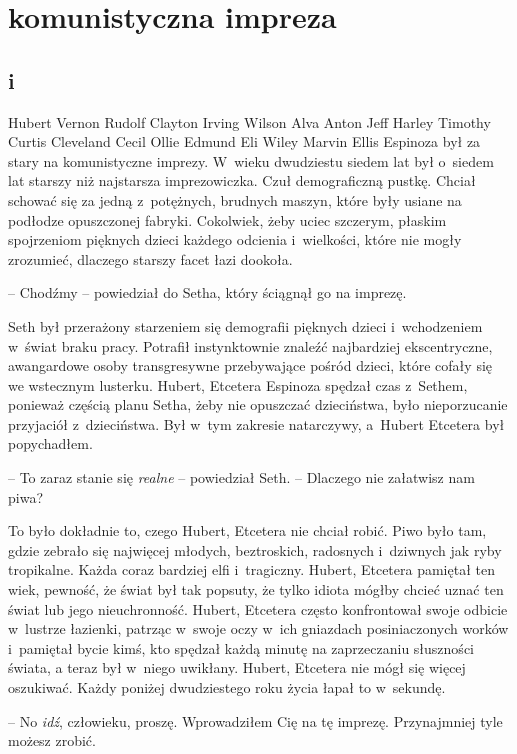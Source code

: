 \documentclass[oneside,polish,11pt,sfheadings]{mwbk}
\begin{document}
\vfill


\part{komunistyczna impreza}
\chapter*{i}

Hubert Vernon Rudolf Clayton Irving Wilson Alva Anton Jeff Harley
Timothy Curtis Cleveland Cecil Ollie Edmund Eli Wiley Marvin Ellis
Espinoza był za stary na komunistyczne imprezy. W~wie\-ku dwudziestu siedem lat był o~siedem lat starszy niż najstarsza imprezowiczka. Czuł demograficzną
pustkę. Chciał schować się za jedną z~potężnych, brudnych maszyn, które
były usiane na podłodze opuszczonej fabryki. Cokolwiek, żeby uciec
szczerym, płaskim spojrzeniom pięknych dzieci każdego odcienia i~wielkości, które nie mogły zrozumieć, dlaczego starszy facet łazi
dookoła.

-- Chodźmy -- powiedział do Setha, który ściągnął go na imprezę. 

Seth był przerażony starzeniem się demografii pięknych dzieci i~wchodzeniem w~świat braku pracy. Potrafił instynktownie znaleźć najbardziej
ekscentryczne, awangardowe osoby transgresywne przebywające pośród
dzieci, które cofały się we wstecznym lusterku. Hubert, Etcetera
Espinoza spędzał czas z~Sethem, ponieważ częścią planu Setha, żeby
nie opuszczać dzieciństwa, było nieporzucanie przyjaciół z~dzieciństwa.
Był w~tym zakresie natarczywy, a~Hubert Etcetera był popychadłem.

-- To zaraz stanie się \textit{realne} -- powiedział Seth. -- Dlaczego nie
załatwisz nam piwa?

To było dokładnie to, czego Hubert, Etcetera nie chciał robić. Piwo było
tam, gdzie zebrało się najwięcej młodych, beztroskich, radosnych i~dziwnych jak ryby tropikalne. Każda coraz bardziej elfi i~tragiczny.
Hubert, Etcetera pamiętał ten wiek, pewność, że świat był tak popsuty,
że tylko idiota mógłby chcieć uznać ten świat lub jego nieuchronność.
Hubert, Etcetera często konfrontował swoje odbicie w~lustrze łazienki,
patrząc w~swoje oczy w~ich gniazdach posiniaczonych worków i~pamiętał
bycie kimś, kto spędzał każdą minutę na zaprzeczaniu słuszności świata,
a teraz był w~niego uwikłany. Hubert, Etcetera nie mógł się więcej
oszukiwać. Każdy poniżej dwudziestego roku życia łapał to w~sekundę.

-- No \textit{idź}, człowieku, proszę. Wprowadziłem Cię na tę imprezę.
Przynajmniej tyle możesz zrobić.
\end{document}
